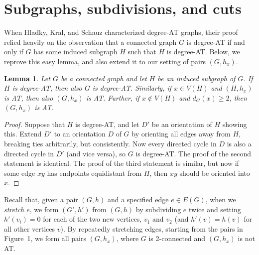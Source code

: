 \documentclass[12pt]{article}
\theoremstyle{plain}
\newtheorem{lem}[thm]{Lemma}
\theoremstyle{definition}
\theoremstyle{remark}
\begin{document}
\section{Subgraphs, subdivisions, and cuts}
\label{prelims}

When Hladky, Kral, and Schauz characterized degree-AT graphs, their proof relied
heavily on the observation that a connected graph $G$ is degree-AT if and only
if $G$ has some induced subgraph $H$ such that $H$ is degree-AT.  Below, we
reprove this easy lemma, and also extend it to our setting of pairs $(G,h_x)$.


\begin{lem}\label{InducedSubgraph}
Let $G$ be a connected graph and let $H$ be an induced subgraph of $G$.  If $H$
is degree-AT, then
also $G$ is degree-AT.  
Similarly, if $x\in V(H)$ and $(H,h_x)$ is AT, then also $(G,h_x)$ is AT.
Further, if $x\notin V(H)$ and $d_G(x)\ge 2$, then $(G,h_x)$ is AT.  
\end{lem}
\begin{proof}
Suppose that $H$ is degree-AT, and let $D'$ be an orientation of $H$ showing
this.  Extend $D'$ to an orientation $D$ of $G$ by orienting all edges away from
$H$, breaking ties arbitrarily, but consistently.  Now every directed cycle in
$D$ is also a directed cycle in $D'$ (and vice versa), so $G$ is degree-AT.
The proof of the second statement is identical.  The proof of the third
statement is similar, but now if some edge $xy$ has endpoints equidistant from
$H$, then $xy$ should be oriented into $x$.
\end{proof}

Recall that, given a pair $(G,h)$ and a specified edge $e\in E(G)$, when we
\emph{stretch $e$}, we form $(G',h')$ from $(G,h)$ by subdividing $e$ twice
and setting $h'(v_i)=0$ for each of the two new vertices, $v_1$ and $v_2$
(and $h'(v)=h(v)$ for all other vertices $v$).  By repeatedly stretching edges,
starting from the pairs in Figure~1, we form all pairs $(G,h_x)$, where $G$ is
2-connected and $(G,h_x)$ is not AT.  
\end{document}
